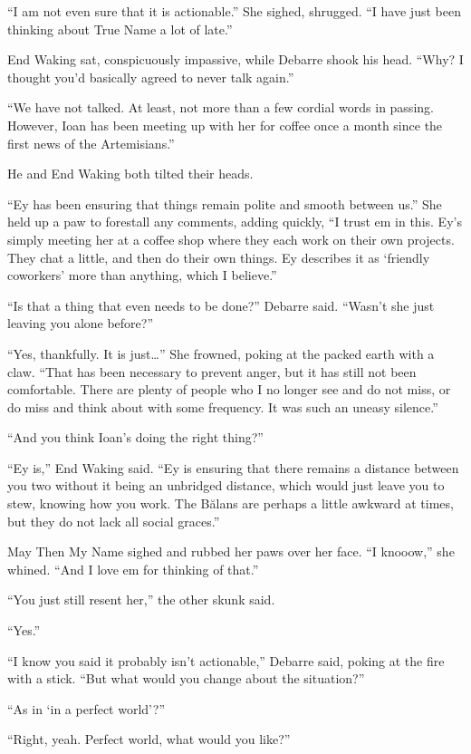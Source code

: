 ``I am not even sure that it is actionable.'' She sighed, shrugged. ``I have just been thinking about True Name a lot of late.''

End Waking sat, conspicuously impassive, while Debarre shook his head. ``Why? I thought you'd basically agreed to never talk again.''

``We have not talked. At least, not more than a few cordial words in passing. However, Ioan has been meeting up with her for coffee once a month since the first news of the Artemisians.''

He and End Waking both tilted their heads.

``Ey has been ensuring that things remain polite and smooth between us.'' She held up a paw to forestall any comments, adding quickly, ``I trust em in this. Ey's simply meeting her at a coffee shop where they each work on their own projects. They chat a little, and then do their own things. Ey describes it as `friendly coworkers' more than anything, which I believe.''

``Is that a thing that even needs to be done?'' Debarre said. ``Wasn't she just leaving you alone before?''

``Yes, thankfully. It is just\ldots{}'' She frowned, poking at the packed earth with a claw. ``That has been necessary to prevent anger, but it has still not been comfortable. There are plenty of people who I no longer see and do not miss, or do miss and think about with some frequency. It was such an uneasy silence.''

``And you think Ioan's doing the right thing?''

``Ey is,'' End Waking said. ``Ey is ensuring that there remains a distance between you two without it being an unbridged distance, which would just leave you to stew, knowing how you work. The Bălans are perhaps a little awkward at times, but they do not lack all social graces.''

May Then My Name sighed and rubbed her paws over her face. ``I knooow,'' she whined. ``And I love em for thinking of that.''

``You just still resent her,'' the other skunk said.

``Yes.''

``I know you said it probably isn't actionable,'' Debarre said, poking at the fire with a stick. ``But what would you change about the situation?''

``As in `in a perfect world'?''

``Right, yeah. Perfect world, what would you like?''

